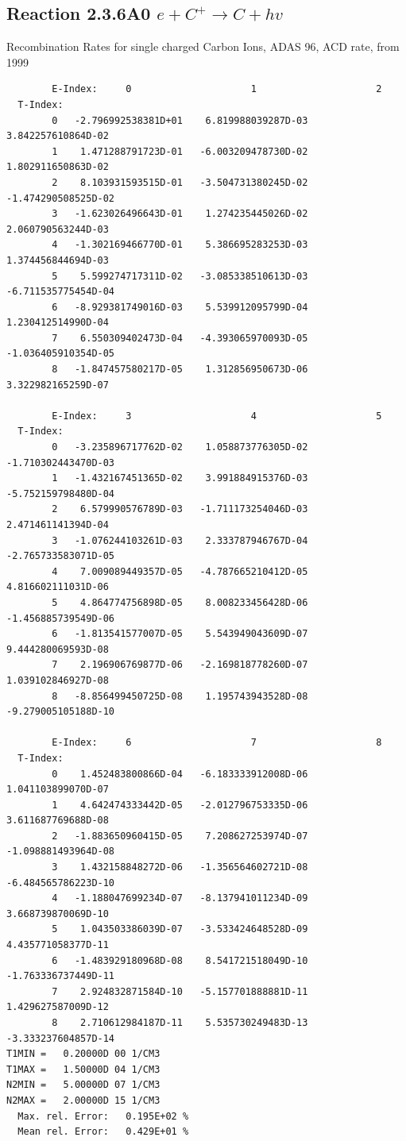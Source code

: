 \documentclass[12pt,dvipdfmx]{article}
\begin{document}
\subsection{
Reaction 2.3.6A0  $e + C^{+} \rightarrow C + hv$
}
 Recombination Rates for single
 charged Carbon Ions, ADAS 96, ACD rate, from 1999


\begin{small}\begin{verbatim}
        E-Index:     0                     1                     2
  T-Index:
        0   -2.796992538381D+01    6.819988039287D-03    3.842257610864D-02
        1    1.471288791723D-01   -6.003209478730D-02    1.802911650863D-02
        2    8.103931593515D-01   -3.504731380245D-02   -1.474290508525D-02
        3   -1.623026496643D-01    1.274235445026D-02    2.060790563244D-03
        4   -1.302169466770D-01    5.386695283253D-03    1.374456844694D-03
        5    5.599274717311D-02   -3.085338510613D-03   -6.711535775454D-04
        6   -8.929381749016D-03    5.539912095799D-04    1.230412514990D-04
        7    6.550309402473D-04   -4.393065970093D-05   -1.036405910354D-05
        8   -1.847457580217D-05    1.312856950673D-06    3.322982165259D-07

        E-Index:     3                     4                     5
  T-Index:
        0   -3.235896717762D-02    1.058873776305D-02   -1.710302443470D-03
        1   -1.432167451365D-02    3.991884915376D-03   -5.752159798480D-04
        2    6.579990576789D-03   -1.711173254046D-03    2.471461141394D-04
        3   -1.076244103261D-03    2.333787946767D-04   -2.765733583071D-05
        4    7.009089449357D-05   -4.787665210412D-05    4.816602111031D-06
        5    4.864774756898D-05    8.008233456428D-06   -1.456885739549D-06
        6   -1.813541577007D-05    5.543949043609D-07    9.444280069593D-08
        7    2.196906769877D-06   -2.169818778260D-07    1.039102846927D-08
        8   -8.856499450725D-08    1.195743943528D-08   -9.279005105188D-10

        E-Index:     6                     7                     8
  T-Index:
        0    1.452483800866D-04   -6.183333912008D-06    1.041103899070D-07
        1    4.642474333442D-05   -2.012796753335D-06    3.611687769688D-08
        2   -1.883650960415D-05    7.208627253974D-07   -1.098881493964D-08
        3    1.432158848272D-06   -1.356564602721D-08   -6.484565786223D-10
        4   -1.188047699234D-07   -8.137941011234D-09    3.668739870069D-10
        5    1.043503386039D-07   -3.533424648528D-09    4.435771058377D-11
        6   -1.483929180968D-08    8.541721518049D-10   -1.763336737449D-11
        7    2.924832871584D-10   -5.157701888881D-11    1.429627587009D-12
        8    2.710612984187D-11    5.535730249483D-13   -3.333237604857D-14
T1MIN =   0.20000D 00 1/CM3
T1MAX =   1.50000D 04 1/CM3
N2MIN =   5.00000D 07 1/CM3
N2MAX =   2.00000D 15 1/CM3
  Max. rel. Error:   0.195E+02 %
  Mean rel. Error:   0.429E+01 %
\end{verbatim}\end{small}
\end{document}
